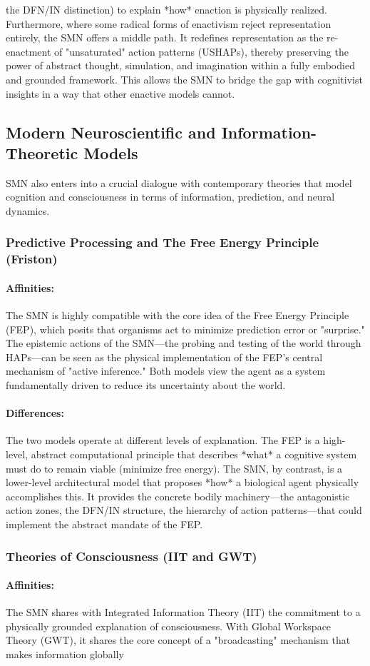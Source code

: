 the DFN/IN distinction) to explain *how* enaction is physically realized. Furthermore, where some radical forms of enactivism reject representation entirely, the SMN offers a middle path. It redefines representation as the re-enactment of "unsaturated" action patterns (USHAPs), thereby preserving the power of abstract thought, simulation, and imagination within a fully embodied and grounded framework. This allows the SMN to bridge the gap with cognitivist insights in a way that other enactive models cannot.
\n\subsection{Modern Neuroscientific and Information-Theoretic Models}\n\label{subsec:comparison_modern}\nThe SMN also enters into a crucial dialogue with contemporary theories that model cognition and consciousness in terms of information, prediction, and neural dynamics.\n\n\subsubsection{Predictive Processing and The Free Energy Principle (Friston)}\n\label{ssubsec:fep}\n\paragraph{Affinities:} The SMN is highly compatible with the core idea of the Free Energy Principle (FEP), which posits that organisms act to minimize prediction error or "surprise." The epistemic actions of the SMN—the probing and testing of the world through HAPs—can be seen as the physical implementation of the FEP's central mechanism of "active inference." Both models view the agent as a system fundamentally driven to reduce its uncertainty about the world.\n\n\paragraph{Differences:} The two models operate at different levels of explanation. The FEP is a high-level, abstract computational principle that describes *what* a cognitive system must do to remain viable (minimize free energy). The SMN, by contrast, is a lower-level architectural model that proposes *how* a biological agent physically accomplishes this. It provides the concrete bodily machinery—the antagonistic action zones, the DFN/IN structure, the hierarchy of action patterns—that could implement the abstract mandate of the FEP.\n\n\subsubsection{Theories of Consciousness (IIT and GWT)}\n\label{ssubsec:consciousness_theories}\n\paragraph{Affinities:} The SMN shares with Integrated Information Theory (IIT) the commitment to a physically grounded explanation of consciousness. With Global Workspace Theory (GWT), it shares the core concept of a "broadcasting" mechanism that makes information globally 